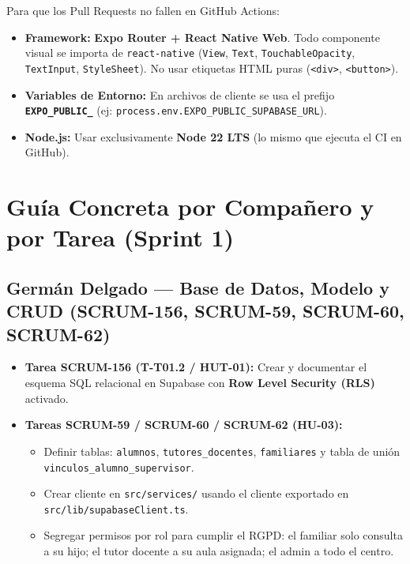 \documentclass[10.5pt,a4paper]{article}
\begin{document}
\begin{tcolorbox}[colback=ggray,colframe=gblue,title=\textbf{Decisión Definitiva: Usar EXPO + REACT NATIVE WEB (Cero Vite)}]
Para que los Pull Requests no fallen en GitHub Actions:
\begin{itemize}[leftmargin=*,itemsep=1pt]
    \item \textbf{Framework:} \textbf{Expo Router + React Native Web}. Todo componente visual se importa de \texttt{react-native} (\texttt{View}, \texttt{Text}, \texttt{TouchableOpacity}, \texttt{TextInput}, \texttt{StyleSheet}). No usar etiquetas HTML puras (\texttt{<div>}, \texttt{<button>}).
    \item \textbf{Variables de Entorno:} En archivos de cliente se usa el prefijo \textbf{\texttt{EXPO\_PUBLIC\_}} (ej: \texttt{process.env.EXPO\_PUBLIC\_SUPABASE\_URL}).
    \item \textbf{Node.js:} Usar exclusivamente \textbf{Node 22 LTS} (lo mismo que ejecuta el CI en GitHub).
\end{itemize}
\end{tcolorbox}

\section{Guía Concreta por Compañero y por Tarea (Sprint 1)}

\subsection{Germán Delgado --- Base de Datos, Modelo y CRUD (SCRUM-156, SCRUM-59, SCRUM-60, SCRUM-62)}
\begin{itemize}[leftmargin=*,itemsep=2pt]
    \item \textbf{Tarea SCRUM-156 (T-T01.2 / HUT-01):} Crear y documentar el esquema SQL relacional en Supabase con \textbf{Row Level Security (RLS)} activado.
    \item \textbf{Tareas SCRUM-59 / SCRUM-60 / SCRUM-62 (HU-03):} 
    \begin{itemize}[leftmargin=*]
        \item Definir tablas: \texttt{alumnos}, \texttt{tutores\_docentes}, \texttt{familiares} y tabla de unión \texttt{vinculos\_alumno\_supervisor}.
        \item Crear cliente en \texttt{src/services/} usando el cliente exportado en \texttt{src/lib/supabaseClient.ts}.
        \item Segregar permisos por rol para cumplir el RGPD: el familiar solo consulta a su hijo; el tutor docente a su aula asignada; el admin a todo el centro.
    \end{itemize}
\end{itemize}
\end{document}

